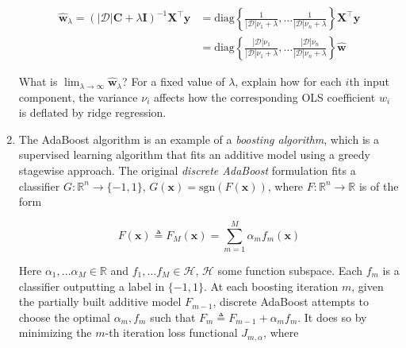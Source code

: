 \documentclass{article}
\numberwithin{equation}{section}
\begin{document}
\begin{enumerate}
    \begin{equation*}
        \begin{split}
            \hat{\mathbf{w}}_\lambda =
            (|\mathcal{D}|\mathbf{C} + \lambda\mathbf{I})^{-1}
            \mathbf{X}^\top\mathbf{y} & =
            \mathrm{diag}\left\{
                \frac{1}{|\mathcal{D}|\nu_1 + \lambda}, \ldots
                \frac{1}{|\mathcal{D}|\nu_n + \lambda}
            \right\}\mathbf{X}^\top\mathbf{y} \\
            & = \mathrm{diag}\left\{
                \frac{|\mathcal{D}|\nu_1}{|\mathcal{D}|\nu_1 + \lambda},
                \ldots \frac{|\mathcal{D}|\nu_n}{|\mathcal{D}|\nu_n + \lambda}
            \right\}\hat{\mathbf{w}}
        \end{split}
    \end{equation*}

    What is $ \lim_{\lambda \rightarrow \infty}\hat{\mathbf{w}}_\lambda $? For
    a fixed value of $ \lambda $, explain how for each $ i $th input component,
    the variance $ \nu_i $ affects how the corresponding OLS coefficient $ w_i $
    is deflated by ridge regression.

    \item
    The AdaBoost\footnotemark{} algorithm is an example of a \textit{boosting algorithm}, which is a
    supervised learning algorithm that fits an additive model using a greedy
    stagewise approach. The original \textit{discrete AdaBoost} formulation fits
    a classifier $ G : \mathbb{R}^n \rightarrow \{-1, 1\} $,
    $ G(\mathbf{x}) = \mathrm{sgn}(F(\mathbf{x})) $, where
    $ F : \mathbb{R}^n \rightarrow \mathbb{R} $ is of the form

    \begin{equation*}
        F(\mathbf{x}) \triangleq F_M(\mathbf{x}) =
        \sum_{m = 1}^M\alpha_mf_m(\mathbf{x})
    \end{equation*}

    Here $ \alpha_1, \ldots \alpha_M \in \mathbb{R} $ and
    $ f_1, \ldots f_M \in \mathcal{H} $, $ \mathcal{H} $ some function subspace.
    Each $ f_m $ is a classifier outputting a label in $ \{-1, 1\} $. At each
    boosting iteration $ m $, given the partially built additive model
    $ F_{m - 1} $, discrete AdaBoost attempts to choose the optimal
    $ \alpha_m, f_m $ such that $ F_m \triangleq F_{m - 1} + \alpha_mf_m $. It
    does so by minimizing the $ m $-th iteration loss functional
    $ J_{m, \alpha} $, where


\end{enumerate}
\end{document}
